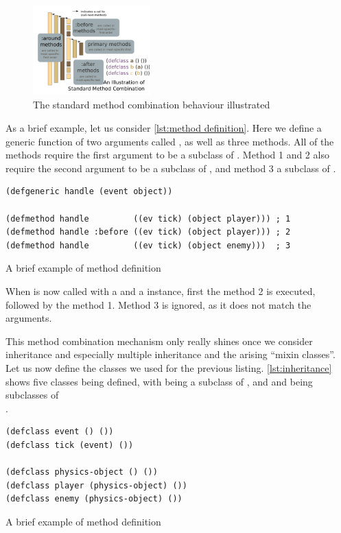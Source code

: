 \documentclass[a4paper]{paper}
\begin{document}
\begin{figure}[h]
  \centering
  \includegraphics[width=0.4\textwidth]{method combination.png}
  \caption{The standard method combination behaviour illustrated}
  \label{fig:method combination}
\end{figure}

As a brief example, let us consider \autoref{lst:method definition}. Here we define a generic function of two arguments called , as well as three methods. All of the methods require the first argument to be a subclass of . Method 1 and 2 also require the second argument to be a subclass of , and method 3 a subclass of .

\begin{listing}[h]
\begin{verbatim}
(defgeneric handle (event object))

(defmethod handle         ((ev tick) (object player))) ; 1
(defmethod handle :before ((ev tick) (object player))) ; 2
(defmethod handle         ((ev tick) (object enemy)))  ; 3
\end{verbatim}
\caption{A brief example of method definition}
\label{lst:method definition}
\end{listing}

\hypertarget{first-call}{When  is now called with a  and a  instance, first the method 2 is executed, followed by the method 1. Method 3 is ignored, as it does not match the arguments.}

This method combination mechanism only really shines once we consider inheritance and especially multiple inheritance and the arising ``mixin classes''. Let us now define the classes we used for the previous listing. \autoref{lst:inheritance} shows five classes being defined, with  being a subclass of , and  and  being subclasses of \\.

\begin{listing}[H]
\begin{verbatim}
(defclass event () ())
(defclass tick (event) ())

(defclass physics-object () ())
(defclass player (physics-object) ())
(defclass enemy (physics-object) ())
\end{verbatim}
\caption{A brief example of method definition}
\label{lst:inheritance}
\end{listing}
\end{document}
